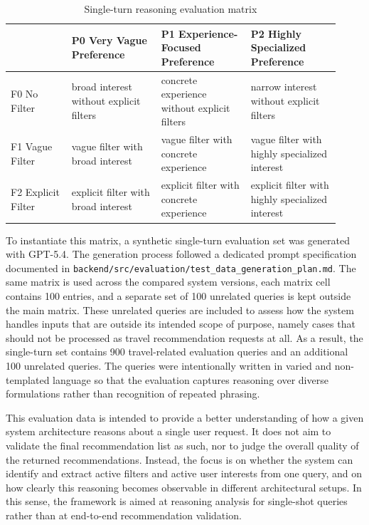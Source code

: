 \begin{table}[htbp]
\centering
\small
\setlength{\tabcolsep}{4pt}
\begin{tabular}{p{0.17\linewidth}p{0.25\linewidth}p{0.25\linewidth}p{0.25\linewidth}}
\hline
 & P0 Very Vague Preference & P1 Experience-Focused Preference & P2 Highly Specialized Preference \\
\hline
F0 No Filter & broad interest without explicit filters & concrete experience without explicit filters & narrow interest without explicit filters \\
F1 Vague Filter & vague filter with broad interest & vague filter with concrete experience & vague filter with highly specialized interest \\
F2 Explicit Filter & explicit filter with broad interest & explicit filter with concrete experience & explicit filter with highly specialized interest \\
\hline
\end{tabular}
\caption{Single-turn reasoning evaluation matrix}
\label{table:recommendation-generation:reasoning-matrix}
\end{table}

To instantiate this matrix, a synthetic single-turn evaluation set was generated with GPT-5.4. The generation process followed a dedicated prompt specification documented in \texttt{backend/src/evaluation/test\_data\_generation\_plan.md}. The same matrix is used across the compared system versions, each matrix cell contains 100 entries, and a separate set of 100 unrelated queries is kept outside the main matrix. These unrelated queries are included to assess how the system handles inputs that are outside its intended scope of purpose, namely cases that should not be processed as travel recommendation requests at all. As a result, the single-turn set contains 900 travel-related evaluation queries and an additional 100 unrelated queries. The queries were intentionally written in varied and non-templated language so that the evaluation captures reasoning over diverse formulations rather than recognition of repeated phrasing.

This evaluation data is intended to provide a better understanding of how a given system architecture reasons about a single user request. It does not aim to validate the final recommendation list as such, nor to judge the overall quality of the returned recommendations. Instead, the focus is on whether the system can identify and extract active filters and active user interests from one query, and on how clearly this reasoning becomes observable in different architectural setups. In this sense, the framework is aimed at reasoning analysis for single-shot queries rather than at end-to-end recommendation validation.

